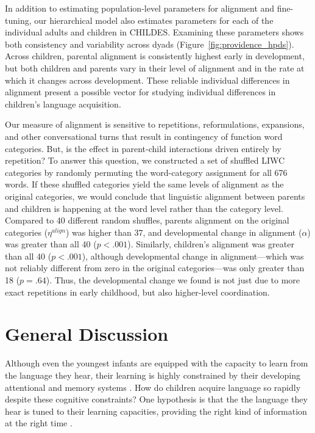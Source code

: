 \documentclass[10pt,letterpaper]{article}
\begin{document}
In addition to estimating population-level parameters for alignment and fine-tuning, our hierarchical model also estimates parameters for each of the individual adults and children in CHILDES. Examining these parameters shows both consistency and variability across dyads (Figure~\ref{fig:providence_hpds}). Across children, parental alignment is consistently highest early in development, but both children and parents vary in their level of alignment and in the rate at which it changes across development. These reliable individual differences in alignment present a possible vector for studying individual differences in children's language acquisition.

Our measure of alignment is sensitive to repetitions, reformulations, expansions, and other conversational turns that result in contingency of function word categories. But, is the effect in parent-child interactions driven entirely by repetition? To answer this question, we constructed a set of shuffled LIWC categories by randomly permuting the word-category assignment for all 676 words. If these shuffled categories yield the same levels of alignment as the original categories, we would conclude  that linguistic alignment between parents and children is happening at the word level rather than the category level. Compared to  40 different random shuffles, parents alignment on the original categories  ($\eta^{align}$) was higher than 37, and developmental change in alignment ($\alpha$) was greater than all 40 ($p < .001$). Similarly, children's alignment was greater than all 40 ($p < .001$), although developmental change in alignment---which was not reliably different from zero in the original categories---was only greater than 18 ($p = .64$). Thus, the developmental change we found is not just due to more exact repetitions in early childhood, but also higher-level coordination.

\section{General Discussion}

Although even the youngest infants are equipped with the capacity to learn from the language they hear, their learning is highly constrained by their developing attentional and memory systems \cite{vlach2013}. How do children acquire language so rapidly despite these cognitive constraints? One hypothesis is that the the language they hear is tuned to their learning capacities, providing the right kind of information at the right time \cite{snow1972, vygotsky1978}.
\end{document}
